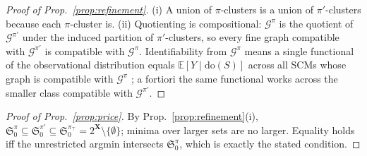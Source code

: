 \documentclass{article}
\newcommand{\E}{\mathbb{E}}
\renewcommand{\do}{\mathrm{do}}
\newcommand{\Gq}{\mathcal{G}^{\pi}}
\newcommand{\ESpi}{\mathfrak{S}^{\pi}}
\begin{document}
\begin{proof}[Proof of Prop.~\ref{prop:refinement}]
(i) A union of $\pi$-clusters is a union of $\pi'$-clusters because each
$\pi$-cluster is. (ii) Quotienting is compositional: $\Gq$ is the quotient
of $\mathcal{G}^{\pi'}$ under the induced partition of $\pi'$-clusters, so
every fine graph compatible with $\mathcal{G}^{\pi'}$ is compatible with
$\Gq$. Identifiability from $\Gq$ means a single functional of the
observational distribution equals $\E[Y \mid \do(S)]$ across all SCMs
whose graph is compatible with $\Gq$ \citep{anand2023cdag}; a fortiori the
same functional works across the smaller class compatible with
$\mathcal{G}^{\pi'}$.
\end{proof}

\begin{proof}[Proof of Prop.~\ref{prop:price}]
By Prop.~\ref{prop:refinement}(i), $\ESpi_0 \subseteq
\mathfrak{S}^{\pi'}_0 \subseteq \mathfrak{S}^{\pi_\top}_0 =
2^{\mathbf{X}}\setminus\{\emptyset\}$; minima over larger sets are no
larger. Equality holds iff the unrestricted argmin intersects $\ESpi_0$,
which is exactly the stated condition.
\end{proof}
\end{document}
